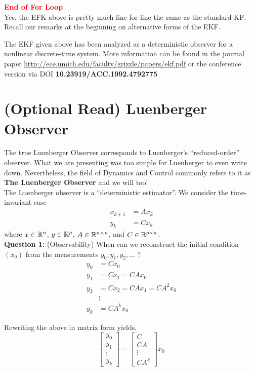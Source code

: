 {\textcolor{red}{\bf End of For Loop} \\

Yes, the EFK above is pretty much line for line the same as the standard KF. Recall our remarks at the beginning on alternative forms of the EKF.

\begin{rem} The EKF given above has been analyzed as a deterministic observer for a nonlinear discrete-time system. More information can be found in the journal paper \url{http://ece.umich.edu/faculty/grizzle/papers/ekf.pdf} or the conference version via DOI \textbf {10.23919/ACC.1992.4792775}

\end{rem}

\section{(Optional Read) Luenberger Observer}

The true Luenberger Observer corresponds to Luenberger's ``reduced-order'' observer. What we are presenting was too simple for Luenberger to even write down. Nevertheless, the field of Dynamics and Control commonly refers to it as \textbf{The Luenberger Observer} and we will too!\\

The Luenberger observer is a ``deterministic estimator''. We consider the time-invariant case
\begin{align*}
    x_{k+1} &= Ax_k \\
y_k &= Cx_k
\end{align*}
where $x \in \mathbb R^n$, $y \in \mathbb R^p$, $A \in \mathbb R^{n \times n}$, and $C \in \mathbb R^{p \times n}$.\\

\textbf{Question 1:} (Observability) When can we reconstruct the initial condition $\left( x_0 \right)$ from the measurements $y_0, y_1, y_2, \ldots$ ?
\begin{align*}
y_0 &= Cx_0\\
y_1 &= Cx_1 = CAx_0\\
y_2 &= Cx_2 = CAx_1 = CA^2x_0\\
&\vdots\\
y_k &= CA^kx_0
\end{align*}

Rewriting the above in matrix form yields,
$$ \left[ \begin{array}{c} y_0 \\ y_1 \\ \vdots \\ y_k \end{array} \right] = \left[ \begin{array}{c} C \\ CA \\ \vdots \\ CA^k \end{array} \right]x_0$$

}
